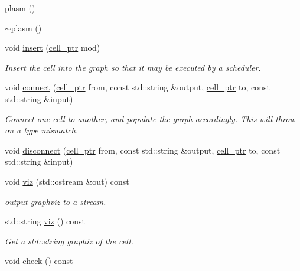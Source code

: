 \begin{DoxyCompactItemize}
\item 
\hyperlink{structecto_1_1plasm_a1d4a2f7e4fa1a4ef839c7ba0316a825c}{plasm} ()
\item 
\hyperlink{structecto_1_1plasm_a3000d2cb042c0875b4d5c38d33763845}{$\sim$plasm} ()
\item 
void \hyperlink{structecto_1_1plasm_a3419c720b1f839cf9b423655cf4de343}{insert} (\hyperlink{namespaceecto_aed1809e82b9229ea81ef9ee3438cf62c}{cell\-\_\-ptr} mod)
\begin{DoxyCompactList}\small\item\em Insert the cell into the graph so that it may be executed by a scheduler. \end{DoxyCompactList}\item 
void \hyperlink{structecto_1_1plasm_a0ca320f5cef8372cfa713fd7991ad3b2}{connect} (\hyperlink{namespaceecto_aed1809e82b9229ea81ef9ee3438cf62c}{cell\-\_\-ptr} from, const std\-::string \&output, \hyperlink{namespaceecto_aed1809e82b9229ea81ef9ee3438cf62c}{cell\-\_\-ptr} to, const std\-::string \&input)
\begin{DoxyCompactList}\small\item\em Connect one cell to another, and populate the graph accordingly. This will throw on a type mismatch. \end{DoxyCompactList}\item 
void \hyperlink{structecto_1_1plasm_a5e187b40ce0a7d7ed9a6859452aed5ca}{disconnect} (\hyperlink{namespaceecto_aed1809e82b9229ea81ef9ee3438cf62c}{cell\-\_\-ptr} from, const std\-::string \&output, \hyperlink{namespaceecto_aed1809e82b9229ea81ef9ee3438cf62c}{cell\-\_\-ptr} to, const std\-::string \&input)
\item 
void \hyperlink{structecto_1_1plasm_a6350e90b6d85a218e7a84183eaed0c18}{viz} (std\-::ostream \&out) const 
\begin{DoxyCompactList}\small\item\em output graphviz to a stream. \end{DoxyCompactList}\item 
std\-::string \hyperlink{structecto_1_1plasm_a4586d90c908123a18dbd3a26c206f63c}{viz} () const 
\begin{DoxyCompactList}\small\item\em Get a std\-::string graphiz of the cell. \end{DoxyCompactList}\item 
void \hyperlink{structecto_1_1plasm_a9554edd5758b8a83ed092a81e249f64a}{check} () const 

\end{DoxyCompactItemize}
